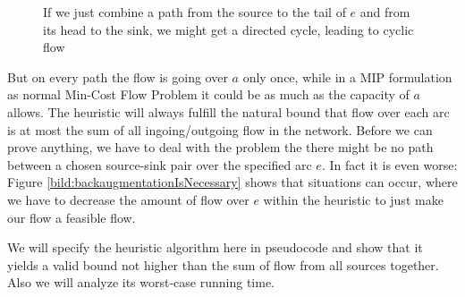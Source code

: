 \begin{figure}[h!]
\centering
{}
\caption{If we just combine a path from the source to the tail of $e$ and from its head to the sink, we might get a 
directed cycle, leading to cyclic flow}
 \label{bild:cycleFromCombinedPaths}
\end{figure}

But on every path the flow is going over $a$ only once, while in a MIP formulation as normal Min-Cost Flow Problem it 
could be as much as the capacity of $a$ allows. The heuristic will always fulfill the natural bound that flow over each 
arc is at most the sum of all ingoing/outgoing flow in the network. Before we can prove anything, we have to deal with 
the problem the there might be no path between a chosen source-sink pair over the specified arc $e$. In fact it is even 
worse: Figure \ref{bild:backaugmentationIsNecessary} %
shows that situations can occur, where we have to decrease the amount of flow over $e$ within the heuristic to just 
make our flow a feasible flow. 

We will specify the heuristic algorithm here in pseudocode and show that it yields a valid bound not higher than the 
sum of flow from all sources together. Also we will analyze its worst-case running time.

